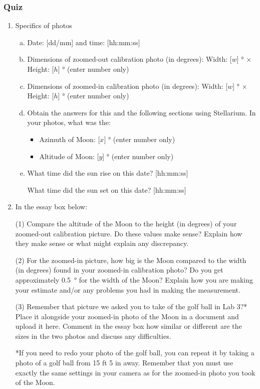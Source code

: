 \documentclass[12pt]{article}
\begin{document}
\subsubsection{Quiz}
\begin{enumerate}
\item
Specifics of photos
\begin{enumerate}[a.]
    \item
    Date: [dd/mm] and time: [hh:mm:ss]
    \item
    Dimensions of zoomed-out calibration photo (in degrees): Width: [$w$] \si{\degree} $\times$ Height: [$h$] \si{\degree} (enter number only)
    \item
    Dimensions of zoomed-in calibration photo (in degrees): Width: [$w$] \si{\degree} $\times$ Height: [$h$] \si{\degree} (enter number only)
    \item
    Obtain the answers for this and the following sections using Stellarium.
    In your photos, what was the:
    \begin{itemize}
        \item Azimuth of Moon: [$x$] \si{\degree} (enter number only)
        \item Altitude of Moon: [$y$] \si{\degree} (enter number only)
    \end{itemize}
    \item
    What time did the sun rise on this date?  [hh:mm:ss]
    
    What time did the sun set on this date?  [hh:mm:ss]
\end{enumerate}
 
\item
In the essay box below:

(1) Compare the altitude of the Moon to the height (in degrees) of your zoomed-out calibration picture. Do these values make sense? Explain how they make sense or what might explain any discrepancy.

(2) For the zoomed-in picture, how big is the Moon compared to the width (in degrees) found in your zoomed-in calibration photo? Do you get approximately \SI{0.5}{\degree} for the width of the Moon? Explain how you are making your estimate and/or any problems you had in making the measurement.

(3) Remember that picture we asked you to take of the golf ball in Lab 3?* Place it alongside your zoomed-in photo of the Moon in a document and upload it here. Comment in the essay box how similar or different are the sizes in the two photos and discuss any difficulties.

*If you need to redo your photo of the golf ball, you can repeat it by taking a photo of a golf ball from 15 ft 5 in away. Remember that you must use exactly the same settings in your camera as for the zoomed-in photo you took of the Moon.
\end{enumerate}
\end{document}
